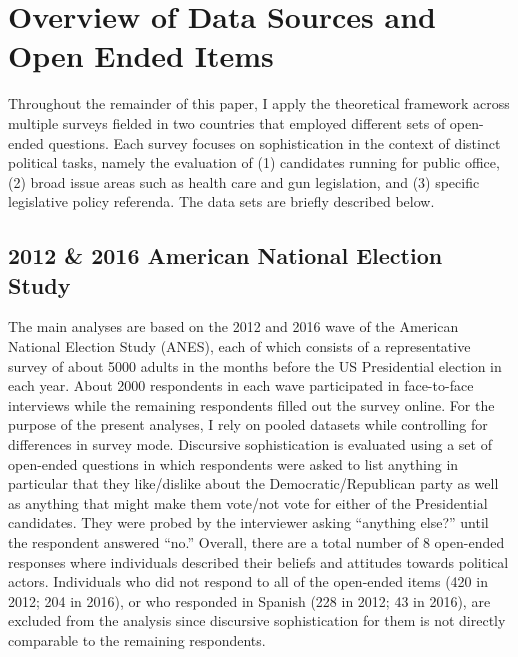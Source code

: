 \section*{Overview of Data Sources and Open Ended Items}

Throughout the remainder of this paper, I apply the theoretical framework across multiple surveys fielded in two countries that employed different sets of open-ended questions. Each survey focuses on sophistication in the context of distinct political tasks, namely the evaluation of (1) candidates running for public office, (2) broad issue areas such as health care and gun legislation, and (3) specific legislative policy referenda. The data sets are briefly described below.


\subsection*{2012 \& 2016 American National Election Study}
The main analyses are based on the 2012 and 2016 wave of the American National Election Study (ANES), each of which consists of a representative survey of about 5000 adults in the months before the US Presidential election in each year. About 2000 respondents in each wave participated in face-to-face interviews while the remaining respondents filled out the survey online. For the purpose of the present analyses, I rely on pooled datasets while controlling for differences in survey mode. Discursive sophistication is evaluated using a set of open-ended questions in which respondents were asked to list anything in particular that they like/dislike about the Democratic/Republican party as well as anything that might make them vote/not vote for either of the Presidential candidates. They were probed by the interviewer asking ``anything else?'' until the respondent answered ``no.'' Overall, there are a total number of 8 open-ended responses where individuals described their beliefs and attitudes towards political actors. Individuals who did not respond to all of the open-ended items (420 in 2012; 204 in 2016), or who responded in Spanish (228 in 2012; 43 in 2016), are excluded from the analysis since discursive sophistication for them is not directly comparable to the remaining respondents.



